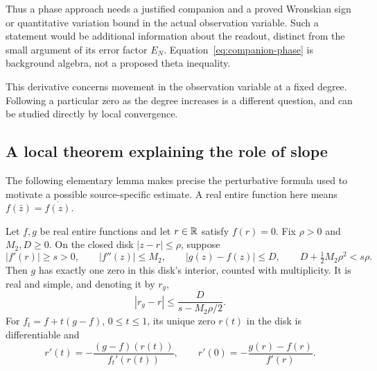 Thus a phase approach needs a justified companion and a proved
Wronskian sign or quantitative variation bound in the actual
observation variable. Such a statement would be additional
information about the readout, distinct from the small argument
of its error factor \(E_N\). Equation~\eqref{eq:companion-phase}
is background algebra, not a proposed theta inequality.

This derivative concerns movement in the observation variable at a
fixed degree. Following a particular zero as the degree increases is a
different question, and can be studied directly by local convergence.

\subsection{A local theorem explaining the role of slope}

The following elementary lemma makes precise the perturbative formula
used to motivate a possible source-specific estimate. A real entire
function here means \(f(\bar z)=\overline{f(z)}\).

\begin{lemma}
\label{lem:zero-motion}
Let \(f,g\) be real entire functions and let \(r\in\mathbb R\) satisfy
\(f(r)=0\). Fix \(\rho>0\) and \(M_2,D\ge0\).
On the closed disk \(|z-r|\le\rho\), suppose
\begin{equation}
 |f'(r)|\ge s>0,\qquad |f''(z)|\le M_2,\qquad
 |g(z)-f(z)|\le D,\qquad
 D+\tfrac12M_2\rho^2<s\rho.
 \label{eq:local-zero-hypotheses}
\end{equation}
Then \(g\) has exactly one zero in this disk's interior, counted with
multiplicity. It is real and simple, and denoting it by \(r_g\),
\begin{equation}
 |r_g-r|\le\frac{D}{s-M_2\rho/2}.
 \label{eq:zero-displacement}
\end{equation}
For \(f_t=f+t(g-f)\), \(0\le t\le1\), its unique zero \(r(t)\)
in the disk is differentiable and
\begin{equation}
 r'(t)=-\frac{(g-f)(r(t))}{f_t'(r(t))},\qquad
 r'(0)=-\frac{g(r)-f(r)}{f'(r)}.
 \label{eq:zero-velocity}
\end{equation}
\end{lemma}

